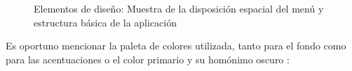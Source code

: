 \documentclass[../PFC.tex]{subfiles}
\begin{document}
\begin{figure}[H]
  \centering
  \hfill
  \caption{Elementos de diseño: Muestra de la disposición espacial del menú y estructura básica de la aplicación}
  \label{img:designElements}
\end{figure}

Es oportuno mencionar la paleta de colores utilizada, tanto para el fondo como para las acentuaciones o el color primario y su homónimo oscuro : 
\end{document}
